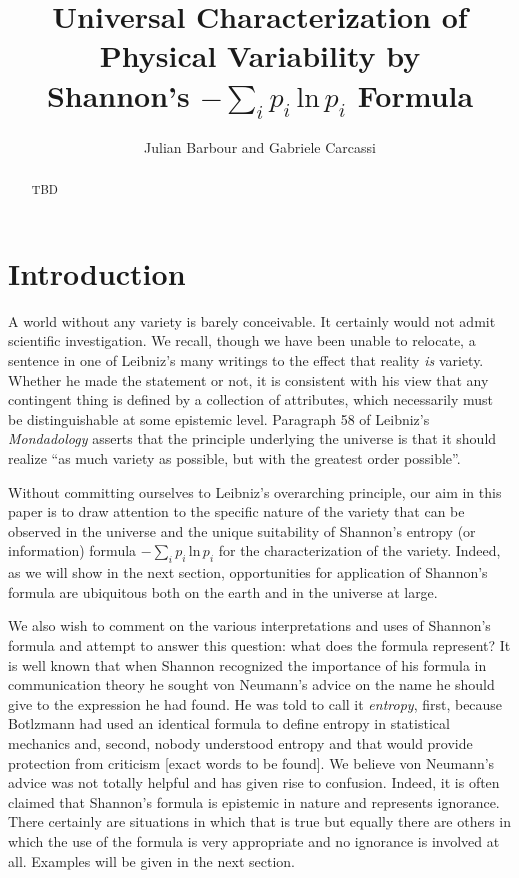 \documentclass{article}
\title{Universal Characterization of Physical Variability by \\Shannon's $-\sum_ip_i\,\textrm{ln}\,p_i$ Formula}
\author{
	Julian Barbour and 
	Gabriele Carcassi
}
\begin{document}
\maketitle

\tableofcontents

\begin{abstract}
TBD
\end{abstract}




\section{Introduction\label{int}}

A world without any variety is barely conceivable. It certainly would not admit scientific investigation. We recall, though we have been unable to relocate, a sentence in one of Leibniz's many writings to the effect that reality \emph{is} variety. Whether he made the statement or not, it is consistent with his view that any contingent thing is defined by a collection of attributes, which necessarily must be distinguishable
at some epistemic level. Paragraph 58 of Leibniz's \emph{Mondadology} asserts that the principle underlying the universe is that it should realize ``as much variety as possible, but with the greatest order possible''.

Without committing ourselves to Leibniz's overarching principle, our aim in this paper is to draw attention to the specific nature of the variety that can be observed in the universe and the unique suitability of Shannon's entropy (or information) formula $-\sum_ip_i\,\textrm{ln}\,p_i$ for the characterization of the variety. Indeed, as we will show in the next section, opportunities for application of Shannon's formula are ubiquitous both on the earth and in the universe at large.

We also wish to comment on the various interpretations and uses of Shannon's formula and attempt to answer this question: what does the formula represent? It is well known that when Shannon recognized the importance of his formula in communication theory he sought von Neumann's advice on the name he should give to the expression he had found. He was told to call it \emph{entropy}, first, because Botlzmann had used an identical formula to define entropy in statistical mechanics and, second, nobody understood entropy and that would provide protection from criticism [exact words to be found]. We believe von Neumann's advice was not totally helpful and has given rise to confusion. Indeed, it is often claimed that Shannon's formula is epistemic in nature and represents ignorance. There certainly are situations in which that is true but equally there are others in which the use of the formula is very appropriate and no ignorance is involved at all. Examples will be given in the next section.
\end{document}
